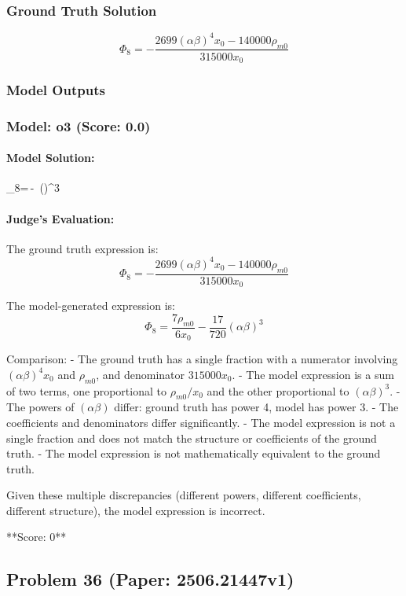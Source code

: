 \documentclass[10pt]{article}
\begin{document}
\subsubsection*{Ground Truth Solution}
\[ \boxed{\Phi_8 = -\frac{2699(\alpha \beta)^4 x_0 - 140000\rho_{m0}}{315000x_0}} \]

\subsubsection*{Model Outputs}
\subsubsection*{Model: o3 (Score: 0.0)}
\paragraph*{Model Solution:}
\displaystyle \Phi _{8}=\,-\,
   (\alpha \beta )^{3}\,

\paragraph*{Judge's Evaluation:}

The ground truth expression is:
\[
\Phi_8 = -\frac{2699(\alpha \beta)^4 x_0 - 140000\rho_{m0}}{315000x_0}
\]

The model-generated expression is:
\[
\Phi_8 = \frac{7 \rho_{m0}}{6 x_0} - \frac{17}{720} (\alpha \beta)^3
\]

Comparison:
- The ground truth has a single fraction with a numerator involving \((\alpha \beta)^4 x_0\) and \(\rho_{m0}\), and denominator \(315000 x_0\).
- The model expression is a sum of two terms, one proportional to \(\rho_{m0}/x_0\) and the other proportional to \((\alpha \beta)^3\).
- The powers of \((\alpha \beta)\) differ: ground truth has power 4, model has power 3.
- The coefficients and denominators differ significantly.
- The model expression is not a single fraction and does not match the structure or coefficients of the ground truth.
- The model expression is not mathematically equivalent to the ground truth.

Given these multiple discrepancies (different powers, different coefficients, different structure), the model expression is incorrect.

**Score: 0**

\newpage
\subsection*{Problem 36 (Paper: 2506.21447v1)}
\end{document}
